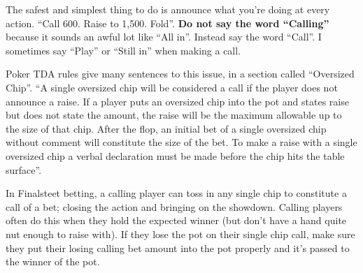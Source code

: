 The safest and simplest thing to do is announce what you're doing
at every action. ``Call 600. Raise to 1,500. Fold''. \textbf{Do not
say the word ``Calling''} because it sounds an awful lot like ``All
in''. Instead say the word ``Call''. I sometimes say ``Play'' or
``Still in'' when making a call.

Poker TDA rules give many sentences to this issue, in a section
called ``Oversized Chip''. ``A single oversized chip will be considered
a call if the player does not announce a raise. If a player puts an
oversized chip into the pot and states raise but does not state the
amount, the raise will be the maximum allowable up to the size of that
chip. After the flop, an initial bet of a single oversized chip
without comment will constitute the size of the bet. To make a raise
with a single oversized chip a verbal declaration must be made
before the chip hits the table surface''.

In Finalsteet betting, a calling player can toss in any single chip to
constitute a call of a bet; closing the action and bringing on the
showdown. Calling players often do this when they hold the expected
winner (but don't have a hand quite nut enough to raise with). If they
lose the pot on their single chip call, make sure they put their
losing calling bet amount into the pot properly and it's passed to the
winner of the pot.




